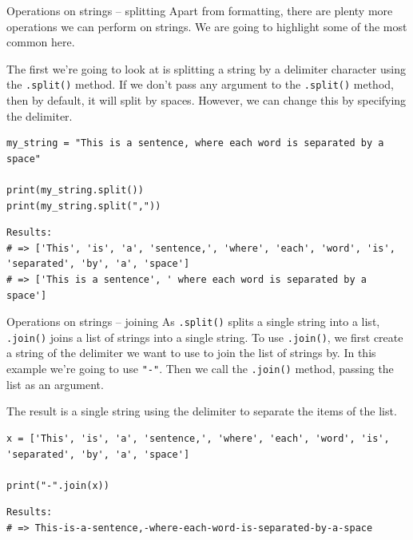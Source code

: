 \documentclass[10pt]{beamer}
\begin{document}
\begin{frame}[label={sec:org178f7bf},fragile]{Operations on strings -- splitting}
 Apart from formatting, there are plenty more operations we can perform on strings. We
are going to highlight some of the most common here.

The first we're going to look at is splitting a string by a delimiter character using
the \texttt{.split()} method. If we don't pass any argument to the \texttt{.split()} method, then by
default, it will split by spaces. However, we can change this by specifying the
delimiter.

\begin{verbatim}
my_string = "This is a sentence, where each word is separated by a space"

print(my_string.split())
print(my_string.split(","))
\end{verbatim}

\begin{verbatim}
Results: 
# => ['This', 'is', 'a', 'sentence,', 'where', 'each', 'word', 'is', 'separated', 'by', 'a', 'space']
# => ['This is a sentence', ' where each word is separated by a space']
\end{verbatim}
\end{frame}

\begin{frame}[label={sec:orgdf51cbd},fragile]{Operations on strings -- joining}
 As \texttt{.split()} splits a single string into a list, \texttt{.join()} joins a list of strings into
a single string. To use \texttt{.join()}, we first create a string of the delimiter we want to
use to join the list of strings by. In this example we're going to use \texttt{"-"}. Then we
call the \texttt{.join()} method, passing the list as an argument.

The result is a single string using the delimiter to separate the items of the list.

\begin{verbatim}
x = ['This', 'is', 'a', 'sentence,', 'where', 'each', 'word', 'is', 'separated', 'by', 'a', 'space']

print("-".join(x))
\end{verbatim}

\begin{verbatim}
Results: 
# => This-is-a-sentence,-where-each-word-is-separated-by-a-space
\end{verbatim}
\end{frame}
\end{document}

